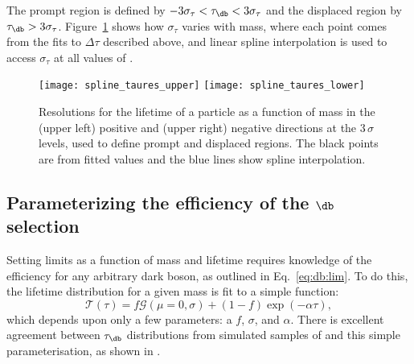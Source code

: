 The prompt region is defined by $-3\sigma_\tau<\tau_{\db}<3\sigma_\tau$ and the displaced region
by $\tau_{\db}>3\sigma_\tau$.
Figure~\ref{fig:eff:res} shows how $\sigma_\tau$ varies with mass, where each point comes from the
fits to $\Delta\tau$ described above, and linear spline interpolation is used to access
$\sigma_\tau$ at all values of .



\begin{figure}
  \begin{center}
    \texttt{[image: spline\_taures\_upper]}
    \texttt{[image: spline\_taures\_lower]}\\
    \caption[Parameterisation of lifetime resolution as a function of \db mass]
    {
      Resolutions for the lifetime of a particle as a function of mass in the
      (upper left) positive and
      (upper right) negative directions at the $3\,\sigma$ levels, used to
      define prompt and displaced regions.
      The black points are from fitted values and the blue lines show spline interpolation.
    }
    \label{fig:eff:res}
  \end{center}
\end{figure}



\subsection[Parameterizing the efficiency of the \db selection]
{Parameterizing the efficiency of the $\boldsymbol{\db}$ selection}
Setting limits as a function of mass and lifetime requires knowledge of the efficiency for any arbitrary
dark boson, as outlined in Eq.~\ref{eq:db:lim}.
To do this, the lifetime distribution for a given mass is fit to a simple function:
\begin{equation}
  \mathcal{T}(\tau) = f\mathcal{G}(\mu=0, \sigma) + (1-f)\exp\left(-\alpha\tau\right),
  \label{eq:eff:parameters}
\end{equation}
which depends upon only a few parameters: a $f$, $\sigma$, and $\alpha$.
There is excellent agreement between $\tau_\db$ distributions from simulated samples of \btokstrdb
and this simple parameterisation, as shown in .

